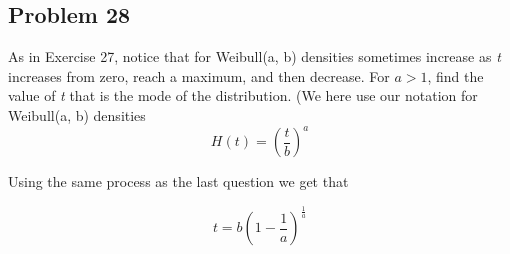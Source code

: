 \documentclass{article}
\begin{document}
\subsection*{Problem 28}
As in Exercise 27, notice that for Weibull(a, b) densities sometimes increase as \textit{t} increases from zero, reach a maximum, and then decrease. For $a > 1$, find the value of \textit{t} that is the mode of the distribution. (We here use our notation for Weibull(a, b) densities
\begin{equation}
    H(t)  = \left(\frac{t}{b}\right)^a
\end{equation}
\begin{center}
    Using the same process as the last question we get that
\end{center}
\begin{equation}
    t = b(1-\frac{1}{a})^{\frac{1}{a}}
\end{equation}
\end{document}

